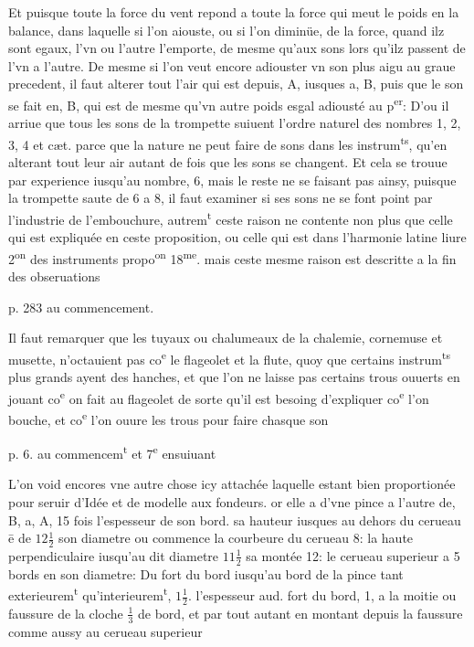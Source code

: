 \documentclass[11pt,a4paper]{article}
\begin{document}
Et puisque toute la force du vent repond a toute la force qui meut le poids en la balance, dans laquelle si l'on aiouste, ou si l'on diminüe, de la force, quand ilz sont egaux, l'vn ou l'autre l'emporte, de mesme qu'aux sons lors qu'ilz passent de l'vn a l'autre. De mesme si l'on veut encore adiouster vn son plus aigu au graue precedent, il faut alterer tout l'air qui est depuis, A, iusques a, B, puis que le son se fait en, B, qui est de mesme qu'vn autre poids esgal adiousté au p\textsuperscript{er}: D'ou il arriue que tous les sons de la trompette suiuent l'ordre naturel des nombres 1, 2, 3, 4 et cæt. parce que la nature ne peut faire de sons dans les instrum\textsuperscript{ts}, qu'en alterant tout leur air autant de fois que les sons se changent. Et cela se trouue par experience iusqu'au nombre, 6, mais le reste ne se faisant pas ainsy, puisque la trompette saute de 6 a 8, il faut examiner si ses sons ne se font point par l'industrie de l'embouchure, autrem\textsuperscript{t} ceste raison ne contente non plus que celle qui est expliquée en ceste proposition, ou celle qui est dans l'harmonie latine liure 2\textsuperscript{on} des instruments propo\textsuperscript{on} 18\textsuperscript{me}. mais ceste mesme raison est descritte a la fin des obseruations

p. 283 au commencement.

Il faut remarquer que les tuyaux ou chalumeaux de la chalemie, cornemuse et musette, n'octauient pas co\textsuperscript{e} le flageolet et la flute, quoy que certains instrum\textsuperscript{ts} plus grands ayent des hanches, et que l'on ne laisse pas certains trous ouuerts en jouant co\textsuperscript{e} on fait au flageolet de sorte qu'il est besoing d'expliquer co\textsuperscript{e} l'on bouche, et co\textsuperscript{e} l'on ouure les trous pour faire chasque son


p. 6. au commencem\textsuperscript{t} et 7\textsuperscript{e} ensuiuant

L'on void encores vne autre chose icy attachée laquelle estant bien proportionée pour seruir d'Idée et de modelle aux fondeurs. or elle a d'vne pince a l'autre de, B, a, A, 15 fois l'espesseur de son bord. sa hauteur iusques au dehors du cerueau ē de $12\frac{1}{2}$  son diametre ou commence la courbeure du cerueau 8: la haute perpendiculaire iusqu'au dit diametre $11\frac{1}{2}$ sa montée 12: le cerueau superieur a 5 bords en son diametre: Du fort du bord iusqu'au bord de la pince tant exterieurem\textsuperscript{t} qu'interieurem\textsuperscript{t}, $1\frac{1}{2}$. l'espesseur aud. fort du bord, 1, a la moitie ou faussure de la cloche $\frac{1}{3}$ de bord, et par tout autant en montant depuis la faussure comme aussy au cerueau superieur
\end{document}
